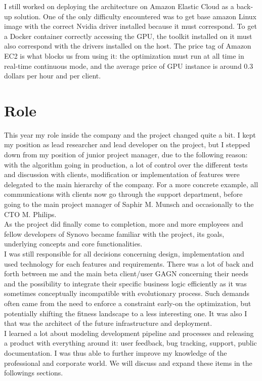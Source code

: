 \documentclass[12pt]{memoir}
\begin{document}
I still worked on deploying the architecture on Amazon Elastic Cloud as a back-up
solution. One of the only difficulty encountered was to get base amazon Linux image with the
correct Nvidia driver installed because it must correspond. To get a Docker
container correctly accessing the GPU, the toolkit installed on it must also
correspond with the drivers installed on the host.
The price tag of Amazon EC2 is what blocks us from using it: the optimization must
run at all time in real-time continuous mode, and the average price of GPU instance
is around 0.3 dollars per hour and per client.

\newpage

\section{Role}

This year my role inside the company and the project changed quite a bit. I kept
my position as lead researcher and lead developer on the project, but I stepped
down from my position of junior project manager, due to the following reason: with
the algorithm going in production, a lot of control over the different tests and discussion with
clients, modification or implementation of features were delegated to the main
hierarchy of the company. For a more concrete example, all communications with clients now
go through the support department, before going to the main project manager of
Saphir M. Munsch and occasionally to the CTO M. Philips.\\
As the project did finally come to completion, more and more employees and fellow
developers of Synovo became familiar with the project, its goals, underlying
concepts and core functionalities. \\
I was still responsible for all decisions concerning design, implementation
and used technology for each features and requirements. There was a lot of back and
forth between me and the main beta client/user GAGN concerning their needs and
the possibility to integrate their specific business logic efficiently as it was
sometimes conceptually incompatible with evolutionary process. Such demands often
came from the need to enforce a constraint early-on the optimization, but potentially
shifting the fitness landscape to a less interesting one. It was also I that was the
architect of the future infrastructure and deployment. \\
I learned a lot about modeling development pipeline and processes and releasing a
product with everything around it: user feedback, bug tracking, support, public
documentation. I was thus able to further improve my knowledge of the professional
and corporate world. We will discuss and expand these items in the followings sections.
\end{document}
